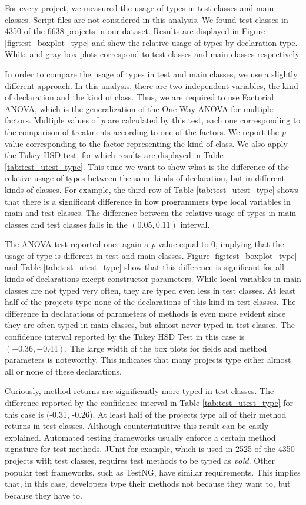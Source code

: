 \documentclass[msc]{ppgccufmg}
\begin{document}
For every project, we measured the usage of types in test classes and main classes.
Script files are not considered in this analysis.
We found test classes in 4350 of the 6638 projects in our dataset.
Results are displayed in Figure \ref{fig:test_boxplot_type} and show the relative usage of types by declaration type.
White and gray box plots correspond to test classes and main classes respectively.

In order to compare the usage of types in test and main classes, we use a slightly different approach.
In this analysis, there are two independent variables, the kind of declaration and the kind of class.
Thus, we are required to use Factorial ANOVA, which is the generalization of the One Way ANOVA for multiple factors.
Multiple values of \emph{p} are calculated by this test, each one corresponding to the comparison of treatments according to one of the factors.
We report the \emph{p} value corresponding to the factor representing the kind of class.
We also apply the Tukey HSD test, for which results are displayed in Table \ref{tab:test_utest_type}.
This time we want to show what is the difference of the relative usage of types between the same kinds of declaration, but in different kinds of classes.
For example, the third row of Table \ref{tab:test_utest_type} shows that there is a significant difference in how programmers type local variables in main and test classes.
The difference between the relative usage of types in main classes and test classes falls in the $(0.05, 0.11)$ interval.

The ANOVA test reported once again a \emph{p} value equal to 0, implying that the usage of type is different in test and main classes.
Figure \ref{fig:test_boxplot_type} and Table \ref{tab:test_utest_type} show that this difference is significant for all kinds of declarations except constructor parameters.
While local variables in main classes are not typed very often, they are typed even less in test classes.
At least half of the projects type none of the declarations of this kind in test classes.
The difference in declarations of parameters of methods is even more evident since they are often typed in main classes, but almost never typed in test classes.
The confidence interval reported by the Tukey HSD Test in this case is $(-0.36, -0.44)$.
The large width of the box plots for fields and method parameters is noteworthy.
This indicates that many projects type either almost all or none of these declarations.

Curiously, method returns are significantly more typed in test classes.
The difference reported by the confidence interval in Table \ref{tab:test_utest_type} for this case is (-0.31, -0.26).
At least half of the projects type all of their method returns in test classes.
Although counterintuitive this result can be easily explained.
Automated testing frameworks usually enforce a certain method signature for test methods.
JUnit for example, which is used in 2525 of the 4350 projects with test classes, requires test methods to be typed as \emph{void}.
Other popular test frameworks, such as TestNG, have similar requirements.
This implies that, in this case, developers type their methods not because they want to, but because they have to.
\end{document}
